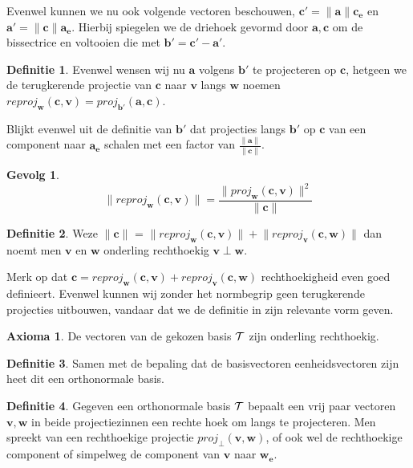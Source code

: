 \documentclass{amsart}
\theoremstyle{definition}
\newtheorem{axm}{Axioma}[section]
\newtheorem{dfn}{Definitie}[section]
\newtheorem{csq}{Gevolg}[section]
\newcommand{\norm}[1]{\lVert{#1}\rVert}
\newcommand{\vvec}[1][v]{\mathbf{#1}}
\newcommand{\uvec}[1][v]{\vvec[#1]_\mathbf{e}}
\newcommand{\vnorm}[1]{\norm{\vvec[#1]}}
\newcommand{\vecrow}[1][a]{\mathcal{\MakeUppercase{#1}}}
\begin{document}
Evenwel kunnen we nu ook volgende vectoren beschouwen, $\vvec[c'] = \vnorm a \uvec[c]$ en $\vvec[a'] = \vnorm c \uvec[a]$.
Hierbij spiegelen we de driehoek gevormd door $\vvec[a], \vvec[c]$ om de bissectrice en voltooien die met $\vvec[b'] = \vvec[c'] - \vvec[a']$.

\begin{dfn}
	Evenwel wensen wij nu $\vvec[a]$ volgens $\vvec[b']$ te projecteren op $\vvec[c]$, hetgeen we de terugkerende projectie van $\vvec[c]$ naar $\vvec$ langs $\vvec[w]$ noemen $reproj_{\vvec[w]}(\vvec[c], \vvec) = proj_{\vvec[b']}(\vvec[a], \vvec[c])$.
\end{dfn}

Blijkt evenwel uit de definitie van $\vvec[b']$ dat projecties langs $\vvec[b']$ op $\vvec[c]$ van een component naar $\uvec[a]$ schalen met een factor van $\frac{\vnorm a}{\vnorm c}$.

\begin{csq}
	\begin{equation*}
		\norm{reproj_{\vvec[w]}(\vvec[c], \vvec)} = \frac{\norm{proj_{\vvec[w]}(\vvec[c], \vvec)}^2}{\vnorm c}
	\end{equation*}
\end{csq}

\begin{dfn}
	Weze $\vnorm c$ = $\norm{reproj_{\vvec[w]}(\vvec[c], \vvec)} + \norm{reproj_{\vvec}(\vvec[c], \vvec[w])}$ dan noemt men $\vvec$ en $\vvec[w]$ onderling rechthoekig $\vvec \perp \vvec[w]$.
\end{dfn}

Merk op dat $\vvec[c] = reproj_{\vvec[w]}(\vvec[c], \vvec) + reproj_{\vvec}(\vvec[c], \vvec[w])$ rechthoekigheid even goed definieert.
Evenwel kunnen wij zonder het normbegrip geen terugkerende projecties uitbouwen, vandaar dat we de definitie in zijn relevante vorm geven.

\begin{axm}
	De vectoren van de gekozen basis $\vecrow[t]$ zijn onderling rechthoekig.
\end{axm}

\begin{dfn}
	Samen met de bepaling dat de basisvectoren eenheidsvectoren zijn heet dit een orthonormale basis.
\end{dfn}

\begin{dfn}
	Gegeven een orthonormale basis $\vecrow[t]$ bepaalt een vrij paar vectoren $\vvec, \vvec[w]$ in beide projectiezinnen een rechte hoek om langs te projecteren.
	Men spreekt van een rechthoekige projectie $proj_\perp(\vvec, \vvec[w])$, of ook wel de rechthoekige component of simpelweg de component van $\vvec$ naar $\uvec[w]$.
\end{dfn}
\end{document}
